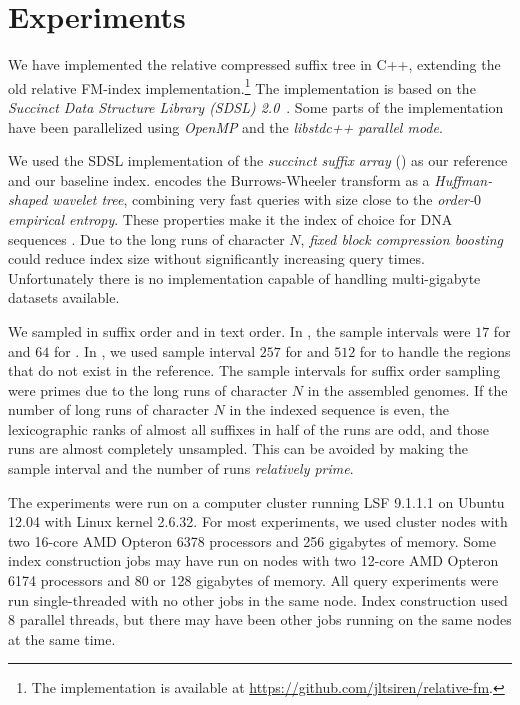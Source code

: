 
\section{Experiments}

We have implemented the relative compressed suffix tree in C++, extending the
old relative FM-index implementation.\footnote{The implementation is available
at \url{https://github.com/jltsiren/relative-fm}.} The implementation is based
on the \emph{Succinct Data Structure Library (SDSL) 2.0}~\cite{Gog2014b}. Some
parts of the implementation have been parallelized using \emph{OpenMP} and the
\emph{libstdc++ parallel mode}.

We used the SDSL implementation of the \emph{succinct suffix array} (\SSA{})
\cite{Ferragina2007a,Maekinen2005} as our reference \CSA{} and our baseline
index. \SSA{} encodes the Burrows-Wheeler transform as a \emph{Huffman-shaped
wavelet tree}, combining very fast queries with size close to the
\emph{order\nobreakdash-$0$ empirical entropy}. These properties make it the
index of choice for DNA sequences \cite{Ferragina2009a}. Due to the long runs
of character $N$, \emph{fixed block compression boosting}
\cite{Kaerkkaeinen2011} could reduce index size without significantly
increasing query times. Unfortunately there is no implementation capable of
handling multi-gigabyte datasets available.

We sampled \SA{} in suffix order and \ISA{} in text order. In \SSA, the sample
intervals were $17$ for \SA{} and $64$ for \ISA. In \RFM, we used sample
interval $257$ for \SA{} and $512$ for \ISA{} to handle the regions that do
not exist in the reference. The sample intervals for suffix order sampling
were primes due to the long runs of character $N$ in the assembled genomes. If
the number of long runs of character $N$ in the indexed sequence is even, the
lexicographic ranks of almost all suffixes in half of the runs are odd, and
those runs are almost completely unsampled. This can be avoided by making the
sample interval and the number of runs \emph{relatively prime}.

The experiments were run on a computer cluster running LSF 9.1.1.1 on Ubuntu
12.04 with Linux kernel 2.6.32. For most experiments, we used cluster nodes
with two 16-core AMD Opteron 6378 processors and 256 gigabytes of memory. Some
index construction jobs may have run on nodes with two 12-core AMD Opteron
6174 processors and 80 or 128 gigabytes of memory. All query experiments were
run single-threaded with no other jobs in the same node. Index construction
used 8 parallel threads, but there may have been other jobs running on the
same nodes at the same time.

